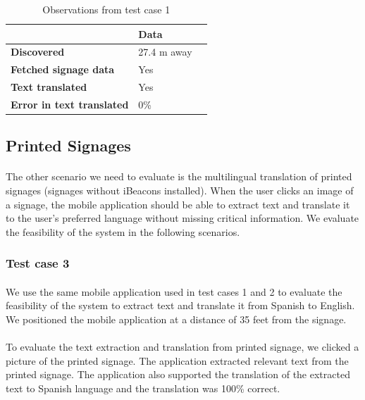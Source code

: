\documentclass[12pt]{article}
\begin{document}
\begin{table}%
    \centering
    \caption{Observations from test case 1} 
    \label{my-label}
       \begin{tabular}{|p{30mm}|p{35mm}|p{35mm}|}
 \hline
  & \textbf{Data}  \\ [0.5ex] 
 \hline\hline
 \textbf{Discovered} & 27.4 m away  \\ 
 \hline
 \textbf{Fetched signage data} & Yes  \\
 \hline
 \textbf{Text translated} & Yes   \\
 \hline
 \textbf{Error in text translated} & 0\%   \\ [1ex] 
 \hline
    \end{tabular}
\end{table}


\subsection{Printed Signages }
\label{twoone}
\paragraph{}The other scenario we need to evaluate is the multilingual translation of printed signages (signages without iBeacons installed). When the user clicks an image of a signage, the mobile application should be able to extract text and translate it to the user's preferred language without missing critical information. We evaluate the feasibility of the system in the following scenarios.

\subsubsection{Test case 3}
\label{threetwo}
\paragraph{}We use the same mobile application used in test cases 1 and 2 to evaluate the feasibility of the system to extract text and translate it from Spanish to English. We positioned the mobile application at a distance of 35 feet from the signage.

\paragraph{}To evaluate the text extraction and translation from printed signage, we clicked a picture of the printed signage. The application extracted relevant text from the printed signage. The application also supported the translation of the extracted text to Spanish language and the translation was 100\% correct.
\end{document}
